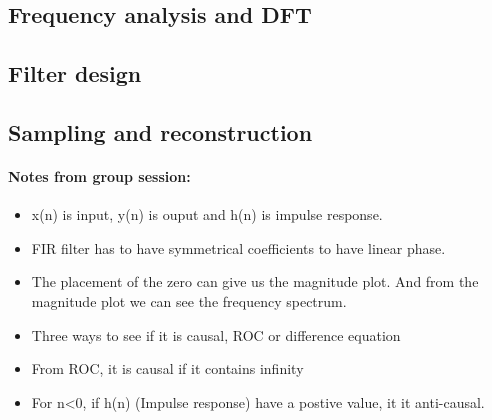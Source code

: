 \documentclass{article}
\begin{document}
\subsection{Frequency analysis and DFT}

\subsection{Filter design}

\subsection{Sampling and reconstruction}

\paragraph{Notes from group session:}
\begin{itemize}
    \item x(n) is input, y(n) is ouput and h(n) is impulse response. 
    \item FIR filter has to have symmetrical coefficients to have linear phase.
    \item The placement of the zero can give us the magnitude plot. And from the magnitude plot we can see the frequency spectrum. 
    \item Three ways to see if it is causal, ROC or difference equation
    \item From ROC, it is causal if it contains infinity
    \item For n<0, if h(n) (Impulse response) have a postive value, it it anti-causal.
\end{itemize}
\end{document}
